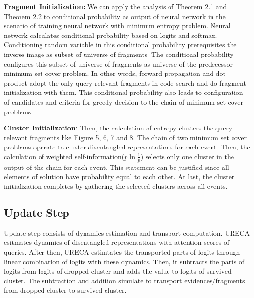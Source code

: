 \textbf{Fragment Initialization: }
We can apply the analysis of Theorem 2.1 and Theorem 2.2 to conditional probability as output of neural network
in the scenario of training neural network with minimum entropy problem.
Neural network calculates conditional probability based on logits and softmax.
Conditioning random variable in this conditional probability prerequisites the inverse image as subset of universe of fragments. 
The conditional probability configures this subset of universe of fragments as universe of the predecessor minimum set cover problem.
In other words, forward propagation and dot product adopt the only query-relevant fragments in code search
and do fragment initialization with them.
This conditional probability also leads to configuration of candidates and criteria 
for greedy decision to the chain of minimum set cover problems

\textbf{Cluster Initialization: }
Then, the calculation of entropy clusters the query-relevant fragments like Figure 5, 6, 7 and 8. 
The chain of two minimum set cover problems operate to cluster disentangled representations for each event.
Then, the calculation of weighted self-information($p\ln{\frac{1}{p}}$) selects only one cluster 
in the output of the chain for each event.
This statement can be justified since all elements of solution have probability equal to each other.  
At last, the cluster initialization completes by gathering the selected clusters across all events. 


\subsection{Update Step}
Update step consists of dynamics estimation and transport computation.
URECA esitmates dynamics of disentangled representations with attention scores of queries. 
After then, URECA estimtates the transported parts of logits through linear combination of logits with these dynamics.
Then, it subtracts the parts of logits from logits of dropped cluster and adds the value to logits of survived cluster.
The subtraction and addition simulate to transport evidences/fragments from dropped cluster to survived cluster.

